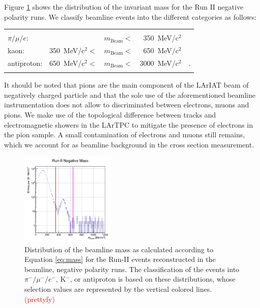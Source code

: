 \documentclass[aps,prl,twocolumn,showpacs,superscriptaddress,groupedaddress]{revtex4}  %
\begin{document}
Figure \ref{fig:mass} shows the distribution of the invariant mass for the Run II negative polarity runs. We classify beamline events into the different categories as follows:

\begin{tabular}{lllrl}
& & & &\\
 $\pi/\mu/e$: &                               & $m_{\text{Beam}}<$& 350~MeV/c$^2$&\\
 kaon:           & 350~MeV/c$^2 <$ & $m_{\text{Beam}}<$& 650~MeV/c$^2$&\\
 antiproton:   & 650~MeV/c$^2 <$ & $m_{\text{Beam}}<$& 3000~MeV/c$^2$&.\\
& & & &\\
\end{tabular}



It should be noted that pions are the main component of the LArIAT beam of negatively charged particle and that the sole use of the aforementioned beamline instrumentation does not allow to discriminated between electrons, muons and pions. We make use of the topological difference between tracks and electromagnetic showers in the LArTPC  to mitigate the presence of electrons in the pion sample. A small contamination of electrons and muons still remains, which we account for as beamline background in the cross section measurement.

\begin{figure}
  \centering  
\includegraphics[width =0.4\textwidth]{massRunII.png}
\caption{Distribution of the beamline mass as calculated according to Equation \ref{eq:mass} for the Run-II events reconstructed in the beamline, negative polarity runs. The classification of the events into $\pi^-/ \mu^-/e^-$, K$^-$, or antiproton is based on these distributions, whose selection values are represented by the vertical colored lines.\textcolor{red}{(prettyfy)}}
\label{fig:mass}
\end{figure}
\end{document}
